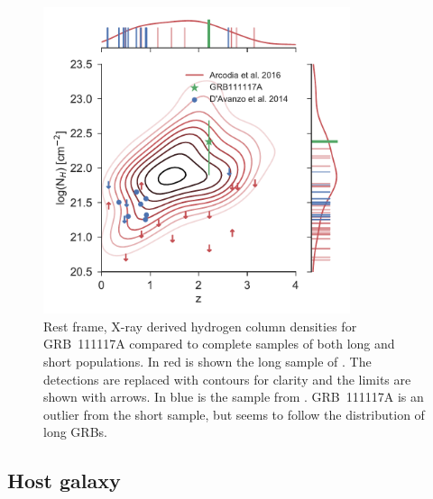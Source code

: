 \documentclass{aa}    %
\begin{document}
\begin{figure}
	\centering
	\includegraphics[width=9cm]{figures/NH_z.pdf}
	\caption{Rest frame, X-ray derived hydrogen column densities for GRB~111117A compared to complete samples of both long and short populations. In red is shown the long sample of \citet{Arcodia2016}. The detections are replaced with contours for clarity and the limits are shown with arrows. In blue is the sample from \citet{DAvanzo2014a}. GRB~111117A is an outlier from the short sample, but seems to follow the distribution of long GRBs.}
	\label{fig:NH_z}
\end{figure}



\subsection{Host galaxy}
\end{document}
